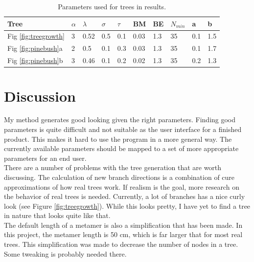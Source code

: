 \documentclass{article}
\begin{document}
  		\begin{table} [h!]
  			\begin{center}
  				\caption{Parameters used for trees in results.}
  				\begin{tabular}{  m{1cm} | P{0.5cm} P{0.5cm} P{0.5cm} P{0.5cm} P{0.5cm} P{0.5cm} P{0.5cm} P{0.5cm} P{0.5cm} } 
  					\hline
  					Tree & $\alpha$ & $\lambda$ & $\sigma$ & $\tau$ & BM & BE & $N_{min}$ & a & b \\
  					\hline
  					Fig \ref{fig:treegrowth} & 3 & 0.52 & 0.5 & 0.1 & 0.03 & 1.3 & 35 & 0.1 & 1.5 \\ 
  					Fig \ref{fig:pinebush}a & 2 & 0.5 & 0.1 & 0.3 & 0.03 & 1.3 & 35 & 0.1 & 1.7 \\ 
  					Fig \ref{fig:pinebush}b & 3 & 0.46 & 0.1 &  0.2 & 0.02 & 1.3 & 35 & 0.2 & 1.3\\ 
  					\hline
  				\end{tabular}
  				\label{table:usedparam}
  			\end{center}
  		\end{table}
  		
  	\section{Discussion}
  		
  		My method generates good looking given the right parameters. Finding good parameters is quite difficult and not suitable as the user interface for a finished product. This makes it hard to use the program in a more general way. The currently available parameters should be mapped to a set of more appropriate parameters for an end user. \\
  		
  		There are a number of problems with the tree generation that are worth discussing. The calculation of new branch directions is a combination of cure approximations of how real trees work. If realism is the goal, more research on the behavior of real trees is needed. Currently, a lot of branches has a nice curly look (see Figure \ref{fig:treegrowth}). While this looks pretty, I have yet to find a tree in nature that looks quite like that. \\
  		
  		The default length of a metamer is also a simplification that has been made. In this project, the metamer length is 50 cm, which is far larger that for most real trees. This simplification was made to decrease the number of nodes in a tree. Some tweaking is probably needed there. \\
  		
\end{document}
